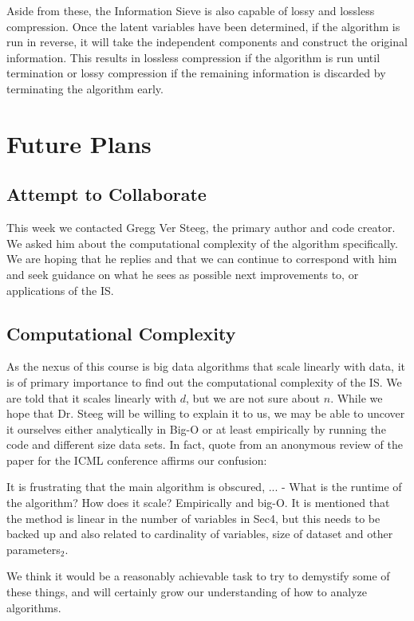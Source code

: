 \documentclass[12pt]{article}
\begin{document}
Aside from these, the Information Sieve is also capable of lossy and lossless compression. Once the latent variables have been determined, if the algorithm is run in reverse, it will take the independent components and construct the original information. This results in lossless compression if the algorithm is run until termination or lossy compression if the remaining information is discarded by terminating the algorithm early. 

\section{Future Plans}


\subsection{Attempt to Collaborate}
This week we contacted Gregg Ver Steeg, the primary author and code creator. We asked him about the computational complexity of the algorithm specifically. We are hoping that he replies and that we can continue to correspond with him and seek guidance on what he sees as possible next improvements to, or applications of the IS.

\subsection{Computational Complexity}
As the nexus of this course is big data algorithms that scale linearly with data, it is of primary importance to find out the computational complexity of the IS. We are told that it scales linearly with $d$, but we are not sure about $n$. While we hope that Dr. Steeg will be willing to explain it to us, we may be able to uncover it ourselves either analytically in Big-O or at least empirically by running the code and different size data sets. In fact, quote from an anonymous review of the paper for the ICML conference affirms our confusion: 

\begin{displayquote}
It is frustrating that the main algorithm is obscured, ... - What is the runtime of the algorithm? How does it scale? Empirically and big-O. It is mentioned that the method is linear in the number of variables in Sec4, but this needs to be backed up and also related to cardinality of variables, size of dataset and other parameters$_{2}$.
\end{displayquote}

We think it would be a reasonably achievable task to try to demystify some of these things, and will certainly grow our understanding of how to analyze algorithms. 
\end{document}
